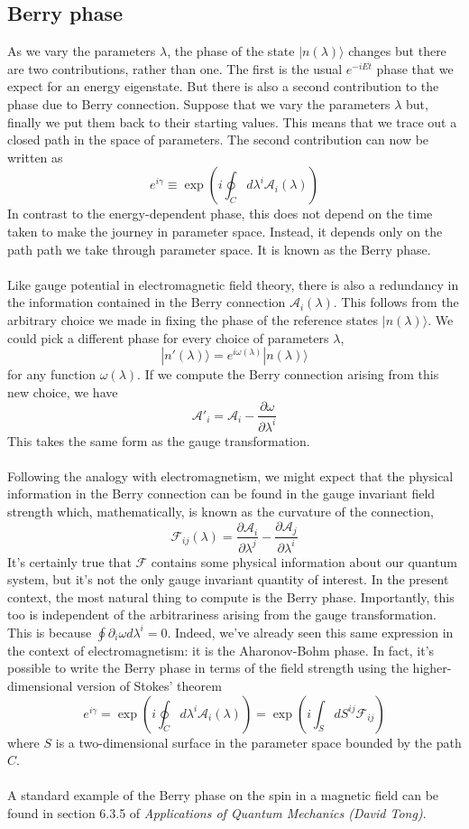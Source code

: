 \subsection{Berry phase}
As we vary the parameters $\lambda$, the phase of the state $|n(\lambda)\rangle$ changes but there are two contributions, rather than one. 
The first is the usual $e^{-iEt}$ phase that we expect for an energy eigenstate. But there is also a second contribution to the phase due to Berry connection.
Suppose that we vary the parameters $\lambda$ but, finally we put them back to their starting values. 
This means that we trace out a closed path in the space of parameters. The second contribution can now be written as
\[e^{i\gamma} \equiv \exp \left( i\oint_C d\lambda^i \mathcal{A}_i(\lambda) \right)\]
In contrast to the energy-dependent phase, this does not depend on the time taken to make the journey in parameter space. Instead, it depends only on the path path we take through parameter space. It is known as the Berry phase.
\\ \\
Like gauge potential in electromagnetic field theory, there is also a redundancy in the information contained in the Berry connection $\mathcal{A}_i(\lambda)$.
This follows from the arbitrary choice we made in fixing the phase of the reference states $|n(\lambda)\rangle$. We could pick a different phase for every choice of parameters $\lambda$,
\[|n'(\lambda)\rangle = e^{i\omega(\lambda)} |n(\lambda)\rangle\]
for any function $\omega(\lambda)$. 
If we compute the Berry connection arising from this new choice, we have
\[\mathcal{A}'_i = \mathcal{A}_i - \frac{\partial \omega}{\partial \lambda^i} \]
This takes the same form as the gauge transformation.
\\ \\
Following the analogy with electromagnetism, we might expect that the physical information in the Berry connection can be found in the gauge invariant field strength which, mathematically, is known as the curvature of the connection,
\[\mathcal{F}_{ij}(\lambda) = \frac{\partial \mathcal{A}_i}{\partial \lambda^j} -  \frac{\partial \mathcal{A}_j}{\partial \lambda^i}\]
It's certainly true that $\mathcal{F}$ contains some physical information about our quantum system, but it's not the only gauge invariant quantity of interest. In the present context, the most natural thing to compute is the Berry phase. Importantly, this too is independent of the arbitrariness arising from the gauge transformation. 
This is because $\oint \partial_i \omega d\lambda^i = 0$. Indeed, we've already seen this same expression in the context of electromagnetism: it is the Aharonov-Bohm phase.
In fact, it's possible to write the Berry phase in terms of the field strength using the higher-dimensional version of Stokes' theorem
\[e^{i\gamma} = \exp \left( i\oint_C d\lambda^i \mathcal{A}_i(\lambda) \right) = \exp \left( i\int_S dS^{ij} \mathcal{F}_{ij} \right)\]
where $S$ is a two-dimensional surface in the parameter space bounded by the path $C$.
\\ \\
A standard example of the Berry phase on the spin in a magnetic field can be found in section 6.3.5 of 
\emph{Applications of Quantum Mechanics (David Tong)}. 

